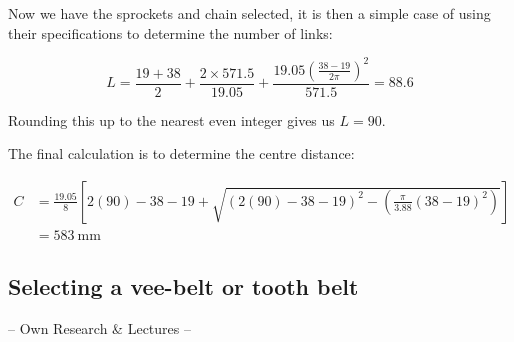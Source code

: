 Now we have the sprockets and chain selected, it is then a simple case of using their specifications to determine the number of links:

\begin{equation}
    L = 
    \frac{19+38}{2}
    +
    \frac{2\times571.5}{19.05}+\frac{19.05{\left(\frac{38-19}{2\pi}\right)}^2}{571.5} = 88.6
\end{equation}

Rounding this up to the nearest even integer gives us \(L=90\).

The final calculation is to determine the centre distance:

\begin{equation}
\begin{split}
    C & = \frac{19.05}{8}
    \left[
    2(90)-38-19 
    +
    \sqrt{ 
    {\left(2(90)-38-19\right)}^2 - \left(\frac{\pi}{3.88}\left(38-19\right)^2\right)
    }
    \right] 
    \\ & = \SI{583}{\milli\metre}
\end{split}
\end{equation}

\subsection{Selecting a vee-belt or tooth belt}

\begin{framed}
    \vspace{1cm}
    \begin{center}
        \Large
        -- Own Research \& Lectures --
    \end{center}
    \vspace{1cm}
\end{framed}

